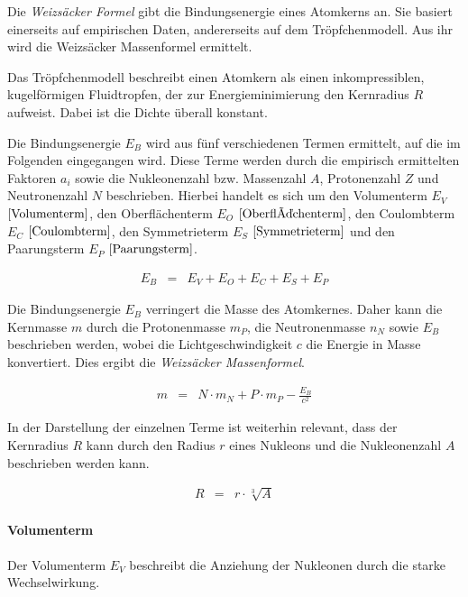 \documentclass[12pt,a4paper]{scrartcl}
\numberwithin{equation}{section} %
\begin{document}
Die \emph{Weizsäcker Formel} gibt die Bindungsenergie eines Atomkerns an. Sie basiert einerseits auf empirischen Daten, andererseits auf dem Tröpfchenmodell. Aus ihr wird die Weizsäcker Massenformel ermittelt.

Das Tröpfchenmodell beschreibt einen Atomkern als einen inkompressiblen, kugelförmigen Fluidtropfen, der zur Energieminimierung den Kernradius $R$ aufweist. Dabei ist die Dichte überall konstant.

Die Bindungsenergie $E_B$ wird aus fünf verschiedenen Termen ermittelt, auf die im Folgenden eingegangen wird. Diese Terme werden durch die empirisch ermittelten Faktoren $a_i$ sowie die Nukleonenzahl bzw. Massenzahl $A$, Protonenzahl $Z$ und Neutronenzahl $N$ beschrieben. Hierbei handelt es sich um den Volumenterm $E_V$ $\eqref{Volumenterm}$, den Oberflächenterm $E_O$ $\eqref{Oberflächenterm}$, den Coulombterm $E_C$ $\eqref{Coulombterm}$, den Symmetrieterm $E_S$ $\eqref{Symmetrieterm}$ und den Paarungsterm $E_P$ $\eqref{Paarungsterm}$.

\begin{eqnarray}
    E_B &=& E_V + E_O + E_C + E_S + E_P
\end{eqnarray}

\noindent
Die Bindungsenergie $E_B$ verringert die Masse des Atomkernes. Daher kann die Kernmasse $m$ durch die Protonenmasse $m_P$, die Neutronenmasse $n_N$ sowie $E_B$ beschrieben werden, wobei die Lichtgeschwindigkeit $c$ die Energie in Masse konvertiert. Dies ergibt die \emph{Weizsäcker Massenformel}.

\begin{eqnarray}
    m &=& N\cdot m_N + P\cdot m_P - \frac{E_B}{c^2}
\end{eqnarray}

\noindent
In der Darstellung der einzelnen Terme ist weiterhin relevant, dass der Kernradius $R$ kann durch den Radius $r$ eines Nukleons und die Nukleonenzahl $A$ beschrieben werden kann.

\begin{eqnarray}
    R &=& r \cdot \sqrt[3]{A}
\end{eqnarray}

\hypertarget{volumenterm}{%
\paragraph{Volumenterm}\label{volumenterm}}

Der Volumenterm $E_V$ beschreibt die Anziehung der Nukleonen durch die starke Wechselwirkung.
\end{document}
